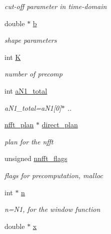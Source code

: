 \begin{CompactItemize}
\begin{CompactList}\small\item\em cut-off parameter in time-domain \item\end{CompactList}\item 
\hypertarget{structnnfft__plan_o11}{
double $\ast$ \hyperlink{structnnfft__plan_o11}{b}}
\label{structnnfft__plan_o11}

\begin{CompactList}\small\item\em shape parameters \item\end{CompactList}\item 
int \hyperlink{structnnfft__plan_o12}{K}
\begin{CompactList}\small\item\em number of precomp \item\end{CompactList}\item 
int \hyperlink{structnnfft__plan_o13}{a\-N1\_\-total}
\begin{CompactList}\small\item\em a\-N1\_\-total=a\-N1\mbox{[}0\mbox{]}$\ast$ .. \item\end{CompactList}\item 
\hypertarget{structnnfft__plan_o14}{
\hyperlink{structnfft__plan}{nfft\_\-plan} $\ast$ \hyperlink{structnnfft__plan_o14}{direct\_\-plan}}
\label{structnnfft__plan_o14}

\begin{CompactList}\small\item\em plan for the nfft \item\end{CompactList}\item 
\hypertarget{structnnfft__plan_o15}{
unsigned \hyperlink{structnnfft__plan_o15}{nnfft\_\-flags}}
\label{structnnfft__plan_o15}

\begin{CompactList}\small\item\em flags for precomputation, malloc \item\end{CompactList}\item 
\hypertarget{structnnfft__plan_o16}{
int $\ast$ \hyperlink{structnnfft__plan_o16}{n}}
\label{structnnfft__plan_o16}

\begin{CompactList}\small\item\em n=N1, for the window function \item\end{CompactList}\item 
\hypertarget{structnnfft__plan_o17}{
double $\ast$ \hyperlink{structnnfft__plan_o17}{x}}
\label{structnnfft__plan_o17}


\end{CompactItemize}

